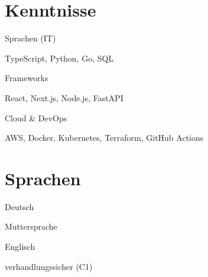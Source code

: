 \documentclass[11pt,a4paper]{article}
\newlength{\datecol}\setlength{\datecol}{3.8cm}
\newlength{\gutter}\setlength{\gutter}{0.4cm}
\newcommand{\cvline}[2]{%
  \noindent\begin{minipage}[t]{\datecol}\raggedright #1\end{minipage}%
  \hspace{\gutter}%
  \begin{minipage}[t]{\dimexpr\linewidth-\datecol-\gutter\relax}\raggedright #2\end{minipage}\par\vspace{0.6ex}}
\begin{document}
\section{Kenntnisse}
\cvline{Sprachen (IT)}{TypeScript, Python, Go, SQL}
\cvline{Frameworks}{React, Next.js, Node.js, FastAPI}
\cvline{Cloud \& DevOps}{AWS, Docker, Kubernetes, Terraform, GitHub Actions}

\section{Sprachen}
\cvline{Deutsch}{Muttersprache}
\cvline{Englisch}{verhandlungssicher (C1)}

\end{document}
